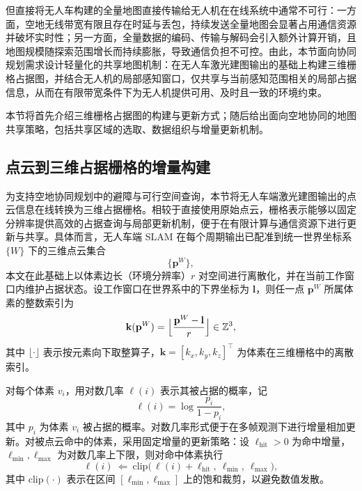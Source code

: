 但直接将无人车构建的全量地图直接传输给无人机在在线系统中通常不可行：一方面，空地无线带宽有限且存在时延与丢包，持续发送全量地图会显著占用通信资源并破坏实时性；另一方面，全量数据的编码、传输与解码会引入额外计算开销，且地图规模随探索范围增长而持续膨胀，导致通信负担不可控。由此，本节面向协同规划需求设计轻量化的共享地图机制：在无人车激光建图输出的基础上构建三维栅格占据图，并结合无人机的局部感知窗口，仅共享与当前感知范围相关的局部占据信息，从而在有限带宽条件下为无人机提供可用、及时且一致的环境约束。

本节将首先介绍三维栅格占据图的构建与更新方式；随后给出面向空地协同的地图共享策略，包括共享区域的选取、数据组织与增量更新机制。

\subsection{点云到三维占据栅格的增量构建}

为支持空地协同规划中的避障与可行空间查询，本节将无人车端激光建图输出的点云信息在线转换为三维占据栅格。相较于直接使用原始点云，栅格表示能够以固定分辨率提供高效的占据查询与局部更新机制，便于在有限计算与通信资源下进行更新与共享。具体而言，无人车端 SLAM 在每个周期输出已配准到统一世界坐标系 $\{W\}$ 下的三维点云集合
\begin{equation}
    \bigl\{\mathbf{p}^{W}\bigr\},
\end{equation}
本文在此基础上以体素边长（环境分辨率）$r$ 对空间进行离散化，并在当前工作窗口内维护占据状态。设工作窗口在世界系中的下界坐标为 $\mathbf{l}$，则任一点 $\mathbf{p}^{W}$ 所属体素的整数索引为
\begin{equation}
    \mathbf{k}(\mathbf{p}^{W})
    =
    \Bigl\lfloor\frac{\mathbf{p}^{W}-\mathbf{l}}{r}\Bigr\rfloor
    \in \mathbb{Z}^3,
    \label{eq:voxel_index}
\end{equation}
其中 $\lfloor\cdot\rfloor$ 表示按元素向下取整算子，$\mathbf{k}=[k_x,k_y,k_z]^\top$ 为体素在三维栅格中的离散索引。

对每个体素 $v_i$，用对数几率 $\ell(i)$ 表示其被占据的概率，记
\begin{equation}
    \ell(i)
    =
    \log\frac{p_i}{1-p_i},
\end{equation}
其中 $p_i$ 为体素 $v_i$ 被占据的概率。对数几率形式便于在多帧观测下进行增量相加更新。对被点云命中的体素，采用固定增量的更新策略：设 $\ell_{\mathrm{hit}}>0$ 为命中增量，$\ell_{\min},\ell_{\max}$ 为对数几率上下限，则对命中体素执行
\begin{equation}
    \ell(i)
    \ \Leftarrow\
    \mathrm{clip}\!\bigl(\,\ell(i) + \ell_{\mathrm{hit}},\ \ell_{\min},\ \ell_{\max}\bigr),
    \label{eq:hit_update_pc_final}
\end{equation}
其中 $\mathrm{clip}(\cdot)$ 表示在区间 $[\ell_{\min},\ell_{\max}]$ 上的饱和裁剪，以避免数值发散。

